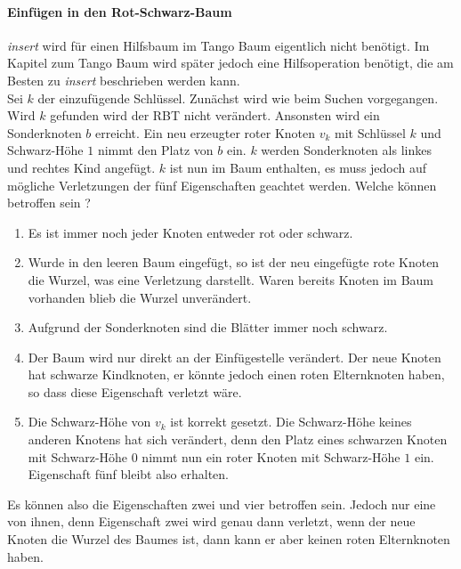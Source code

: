 \documentclass[a4paper,12pt]{article}
\begin{document}
\paragraph{Einfügen in den Rot-Schwarz-Baum}
\textit{insert} wird für einen Hilfsbaum im Tango Baum eigentlich nicht benötigt. Im Kapitel zum Tango Baum wird später jedoch eine Hilfsoperation benötigt, die am Besten zu \textit{insert} beschrieben werden kann.\\
Sei $k$ der einzufügende Schlüssel. Zunächst wird wie beim Suchen vorgegangen. Wird $k$ gefunden wird der RBT nicht verändert. Ansonsten wird ein Sonderknoten $b$ erreicht. Ein neu erzeugter roter Knoten $v_k$ mit Schlüssel $k$ und Schwarz-Höhe $1$ nimmt den Platz von $b$ ein. $k$ werden Sonderknoten als linkes und rechtes Kind angefügt. $k$ ist nun im Baum enthalten, es muss jedoch auf mögliche Verletzungen der fünf Eigenschaften geachtet werden. Welche können betroffen sein ?

\begin{enumerate}
	\item Es ist immer noch jeder Knoten entweder rot oder schwarz.
	\item Wurde in den leeren Baum eingefügt, so ist der neu eingefügte rote Knoten die Wurzel, was eine Verletzung darstellt.  Waren bereits Knoten im Baum vorhanden blieb die Wurzel unverändert.
	\item Aufgrund der Sonderknoten sind die Blätter immer noch schwarz.
	\item Der Baum wird nur direkt an der Einfügestelle verändert. Der neue Knoten hat schwarze Kindknoten, er könnte jedoch einen roten Elternknoten haben, so dass diese Eigenschaft verletzt wäre.
	\item Die Schwarz-Höhe von $v_k$ ist korrekt gesetzt. Die Schwarz-Höhe keines anderen Knotens hat sich verändert, denn den Platz eines schwarzen Knoten mit Schwarz-Höhe $0$ nimmt nun ein roter Knoten mit Schwarz-Höhe $1$ ein. Eigenschaft fünf bleibt also erhalten. 
\end{enumerate}  

\noindent Es können also die Eigenschaften zwei und vier betroffen sein. Jedoch nur eine von ihnen, denn Eigenschaft zwei wird genau dann verletzt, wenn der neue Knoten die Wurzel des Baumes ist, dann kann er aber keinen roten Elternknoten haben.
\end{document}
